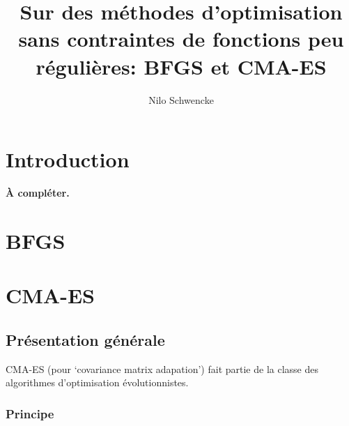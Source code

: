 \documentclass{article}          %
\theoremstyle{definition}
\begin{document}
\title{Sur des m\'ethodes d'optimisation sans contraintes de fonctions peu r\'eguli\`eres: BFGS et CMA-ES}
\author{Nilo Schwencke}
\maketitle

\section{Introduction}

{\bf \`A compl\'eter.}

\section{BFGS}



\section{CMA-ES}

\subsection{Pr\'esentation g\'en\'erale}


CMA-ES (pour `covariance matrix adapation') fait partie de la classe des algorithmes d'optimisation \'evolutionnistes.

\subsubsection{Principe}
\end{document}
